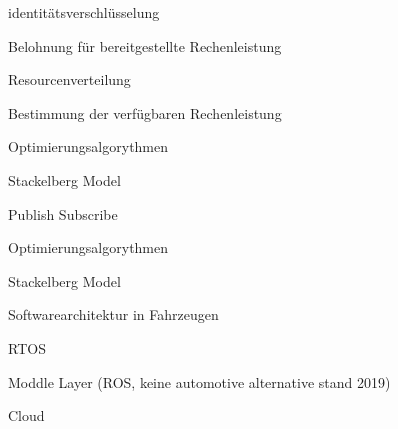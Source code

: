 \begin{notes}
\begin{notes}
        \item identitätsverschlüsselung
        \item Belohnung für bereitgestellte Rechenleistung
    \end{notes}
    \item Resourcenverteilung
    \begin{notes}
        \item Bestimmung der verfügbaren Rechenleistung 
        \item Optimierungsalgorythmen
        \item Stackelberg Model
    \end{notes}
    \item Publish Subscribe
    \begin{notes}
        \item 
        \item Optimierungsalgorythmen
        \item Stackelberg Model
    \end{notes}
    \item Softwarearchitektur in Fahrzeugen
   \begin{notes}
        \item RTOS
        \item Moddle Layer (ROS, keine automotive alternative stand 2019)
        \item Cloud
    \end{notes}

\end{notes}